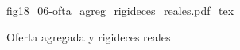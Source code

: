 \begin{figure}[h]
\centering
\def\svgwidth{0.5\textwidth}
{fig18_06-ofta_agreg_rigideces_reales.pdf_tex}
\caption{Oferta agregada y rigideces reales}
\label{fig18_06-ofta_agreg_rigideces_reales}
\end{figure}
